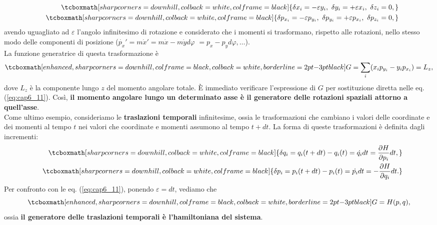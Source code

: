 	\begin{eqnarray}
			& & \tcboxmath[sharp corners=downhill, colback=white, colframe=black]{\delta x_i = -\varepsilon y_i, \ \delta y_i = +\varepsilon x_i, \ \delta z_i =0,}\\
			& &\tcboxmath[sharp corners=downhill, colback=white, colframe=black]{ \delta p_{x_i} = -\varepsilon p_{y_i}, \ \delta p_{y_i} = +\varepsilon p_{x_i}, \ \delta p_{z_i} =0,}
	\end{eqnarray}
avendo uguagliato ad $\varepsilon$ l'angolo infinitesimo di rotazione e considerato che i momenti si trasformano, rispetto alle rotazioni, nello stesso modo delle componenti di posizione ($\dot{p_x}'= m \dot{x}'=  m\dot{x}-m\dot{y}d\varphi$ $=p_x-p_yd\varphi , \dots$).\\
La funzione generatrice di questa trasformazione è
	\begin{equation}
		\tcboxmath[enhanced, sharp corners=downhill, colframe=black, colback=white, borderline={2pt}{-3pt}{black}]{
			G= \sum _i (x_ip_{y_i} - y_i p_{x_i}) = L_z ,
			}
	\end{equation}
dove $L_z$ è la componente lungo $z$ del momento angolare totale. È immediato verificare l'espressione di $G$ per sostituzione diretta nelle eq. (\ref{eq:cap6_11}). Così, \textbf{il momento angolare lungo un determinato asse è il generatore delle rotazioni spaziali attorno a quell'asse}.\\

Come ultimo esempio, consideriamo le \textbf{traslazioni temporali} infinitesime, ossia le trasformazioni che cambiano i valori delle coordinate e dei momenti al tempo $t$ nei valori che coordinate e momenti assumono al tempo $t+dt$. La forma di queste trasformazioni è definita dagli incrementi:
	\begin{eqnarray}
		& &\tcboxmath[sharp corners=downhill, colback=white, colframe=black]{
			\delta q_i = q_i(t+dt)-q_i(t) = \dot{q_i} dt = \frac{\partial H}{\partial p_i}dt,} \\
		& &\tcboxmath[sharp corners=downhill, colback=white, colframe=black]{
			\delta p_i = p_i(t+dt)-p_i(t) = \dot{p_i} dt = -\frac{\partial H}{\partial q_i}dt. }
	\end{eqnarray}
Per confronto con le eq. (\ref{eq:cap6_11}), ponendo $\varepsilon = dt$, vediamo che
	\begin{equation}
		\tcboxmath[enhanced, sharp corners=downhill, colframe=black, colback=white, borderline={2pt}{-3pt}{black}]{
			G=H(p,q) ,
			}
	\end{equation}
ossia \textbf{il generatore delle traslazioni temporali è l'hamiltoniana del sistema}.\\

